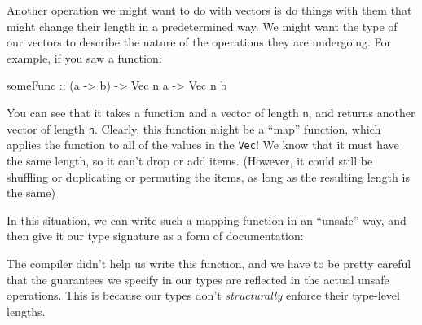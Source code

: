 \documentclass[]{article}
\newenvironment{Shaded}{}{}
\newcommand{\KeywordTok}[1]{\textcolor[rgb]{0.00,0.44,0.13}{\textbf{#1}}}
\newcommand{\DataTypeTok}[1]{\textcolor[rgb]{0.56,0.13,0.00}{#1}}
\newcommand{\CommentTok}[1]{\textcolor[rgb]{0.38,0.63,0.69}{\textit{#1}}}
\newcommand{\OtherTok}[1]{\textcolor[rgb]{0.00,0.44,0.13}{#1}}
\newcommand{\FunctionTok}[1]{\textcolor[rgb]{0.02,0.16,0.49}{#1}}
\newcommand{\NormalTok}[1]{#1}
\begin{document}
Another operation we might want to do with vectors is do things with them that
might change their length in a predetermined way. We might want the type of our
vectors to describe the nature of the operations they are undergoing. For
example, if you saw a function:

\begin{Shaded}
\begin{Highlighting}[]
\OtherTok{someFunc ::}\NormalTok{ (a }\OtherTok{->}\NormalTok{ b) }\OtherTok{->} \DataTypeTok{Vec}\NormalTok{ n a }\OtherTok{->} \DataTypeTok{Vec}\NormalTok{ n b}
\end{Highlighting}
\end{Shaded}

You can see that it takes a function and a vector of length \texttt{n}, and
returns another vector of length \texttt{n}. Clearly, this function might be a
``map'' function, which applies the function to all of the values in the
\texttt{Vec}! We know that it must have the same length, so it can't drop or add
items. (However, it could still be shuffling or duplicating or permuting the
items, as long as the resulting length is the same)

In this situation, we can write such a mapping function in an ``unsafe'' way,
and then give it our type signature as a form of documentation:

\begin{Shaded}
\end{Shaded}

The compiler didn't help us write this function, and we have to be pretty
careful that the guarantees we specify in our types are reflected in the actual
unsafe operations. This is because our types don't \emph{structurally} enforce
their type-level lengths.
\end{document}
